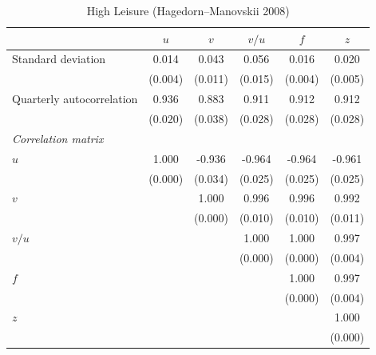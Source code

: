 \begin{table}[ht]
\centering
\caption{High Leisure (Hagedorn--Manovskii 2008)}
\label{tab:hm}
\begin{tabular}{lccccc}
\toprule
 & $u$ & $v$ & $v/u$ & $f$ & $z$ \\
\midrule
Standard deviation & 0.014 & 0.043 & 0.056 & 0.016 & 0.020 \\
 & (0.004) & (0.011) & (0.015) & (0.004) & (0.005) \\
\addlinespace
Quarterly autocorrelation & 0.936 & 0.883 & 0.911 & 0.912 & 0.912 \\
 & (0.020) & (0.038) & (0.028) & (0.028) & (0.028) \\
\midrule
\multicolumn{6}{l}{\textit{Correlation matrix}} \\
\addlinespace
$u$ & 1.000 & -0.936 & -0.964 & -0.964 & -0.961 \\
 & (0.000) & (0.034) & (0.025) & (0.025) & (0.025) \\
\addlinespace
$v$ &  & 1.000 & 0.996 & 0.996 & 0.992 \\
 &  & (0.000) & (0.010) & (0.010) & (0.011) \\
\addlinespace
$v/u$ &  &  & 1.000 & 1.000 & 0.997 \\
 &  &  & (0.000) & (0.000) & (0.004) \\
\addlinespace
$f$ &  &  &  & 1.000 & 0.997 \\
 &  &  &  & (0.000) & (0.004) \\
\addlinespace
$z$ &  &  &  &  & 1.000 \\
 &  &  &  &  & (0.000) \\
\bottomrule
\end{tabular}
\end{table}
